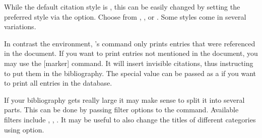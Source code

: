 While the default citation style is , this can be easily changed by
setting the preferred style via the  option. Choose from
,
,  or . Some styles come in
several variations.

In contrast the  environment, 's
 command only prints entries that were referenced in the
document. If you want to print entries not mentioned in the document, you may
use the [marker] command. It will insert invisible citations, thus
instructing  to put them in the bibliography. The special value
\cargv{*} can be passed as a  if you want to print all entries in
the database.

If your bibliography gets really large it may make sense to split it into
several parts. This can be done by passing filter options to the
 command. Available filters include ,
, . It may be useful to also change the titles of
different categories using  option.

